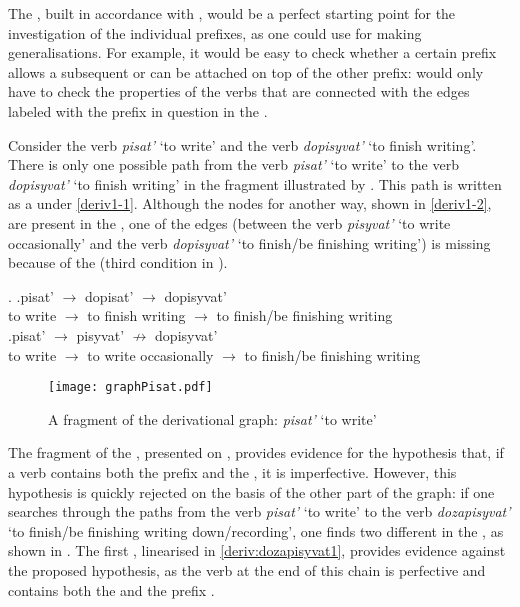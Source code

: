 The , built in accordance with , would be a perfect starting point for the investigation of the individual prefixes, as one could use  for making generalisations. For example, it would be easy to check whether a certain prefix allows a subsequent  or can be attached on top of the other prefix: would only have to check the properties of the verbs that are connected with the edges labeled with the prefix in question in the . 

Consider the verb \textit{pisat'} `to write' and the verb \textit{dopisyvat'} `to finish writing'. There is only one possible path from the verb \textit{pisat'} `to write' to the verb \textit{dopisyvat'} `to finish writing' in the  fragment illustrated by . This path is written as a  under \ref{deriv1-1}. Although the nodes for another way, shown in \ref{deriv1-2}, are present in the , one of the edges (between the verb \textit{pisyvat'} `to write occasionally' and the verb \textit{dopisyvat'} `to finish/be finishing writing') is missing because of the  (third condition in ).

\ex.\label{deriv1} \ag.\label{deriv1-1}pisat'\textsuperscript{\IPF} $\rightarrow$ dopisat'\textsuperscript{\PF} $\rightarrow$ dopisyvat'\textsuperscript{\IPF}\\
{to write} $\rightarrow$ {to finish writing} $\rightarrow$ {to finish/be finishing writing}\\
\bg.\label{deriv1-2}pisat'\textsuperscript{\IPF} $\rightarrow$ pisyvat'\textsuperscript{\IPF} $\nrightarrow$ dopisyvat'\\
{to write} $\rightarrow$ {to write occasionally} $\rightarrow$ {to finish/be finishing writing}\\

\begin{figure}
\texttt{[image: graphPisat.pdf]}
\caption{A fragment of the derivational graph: \textit{pisat'} `to write'\label{tree:dopisyvat}}
\end{figure}

The fragment of the , presented on , provides evidence for the hypothesis that, if a verb contains both the prefix  and the , it is imperfective. However, this hypothesis is quickly rejected on the basis of the other part of the graph: if one searches through the paths from the verb \textit{pisat'} `to write' to the verb \textit{dozapisyvat'} `to finish/be finishing writing down/recording', one finds two different  in the , as shown in . The first , linearised in \ref{deriv:dozapisyvat1}, provides evidence against the proposed hypothesis, as the verb at the end of this chain is perfective and contains both the  and the prefix . 

